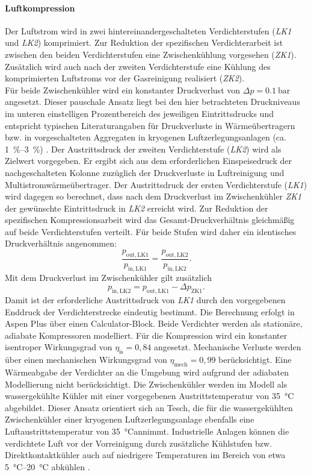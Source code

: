 \paragraph{Luftkompression}\label{sec:modell_komression} Der Luftstrom wird in zwei hintereinandergeschalteten Verdichterstufen (\textit{LK1} und \textit{LK2}) komprimiert. Zur Reduktion der spezifischen Verdichterarbeit ist zwischen den beiden Verdichterstufen eine Zwischenkühlung vorgesehen (\textit{ZK1}). Zusätzlich wird auch nach der zweiten Verdichterstufe eine Kühlung des komprimierten Luftstroms vor der Gasreinigung realisiert (\textit{ZK2}). \\
Für beide Zwischenkühler wird ein konstanter Druckverlust von \(\Delta p = \SI{0,1}{\bar}\) angesetzt. Dieser pauschale Ansatz liegt bei den hier betrachteten Druckniveaus im unteren einstelligen Prozentbereich des jeweiligen Eintrittsdrucks und entspricht typischen Literaturangaben für Druckverluste in Wärmeübertragern bzw. in vorgeschalteten Aggregaten in kryogenen Luftzerlegungsanlagen (ca. \SIrange{1}{3}{\percent}) \cite{teschExergybasedMethodsApplied, zhouProcessConfigurationsSimulations}.
Der Austrittsdruck der zweiten Verdichterstufe (\textit{LK2}) wird als
Zielwert vorgegeben. Er ergibt sich aus dem erforderlichen Einspeisedruck der nachgeschalteten Kolonne zuzüglich der Druckverluste in Luftreinigung und Multistromwärmeübertrager. Der Austrittsdruck der ersten Verdichterstufe (\textit{LK1}) wird dagegen so berechnet, dass nach dem Druckverlust im Zwischenkühler \textit{ZK1} der gewünschte Eintrittsdruck in \textit{LK2} erreicht wird. Zur Reduktion der spezifischen Kompressionsarbeit wird das Gesamt-Druckverhältnis gleichmäßig auf beide Verdichterstufen verteilt. Für beide Stufen wird daher
ein identisches Druckverhältnis angenommen:
\[
\frac{p_{\mathrm{out, LK1}}}{p_{\mathrm{in, LK1}}}
=
\frac{p_{\mathrm{out, LK2}}}{p_{\mathrm{in, LK2}}}.
\]
Mit dem Druckverlust im Zwischenkühler gilt zusätzlich
\[
p_{\mathrm{in, LK2}} = p_{\mathrm{out, LK1}} - \Delta p_{\mathrm{ZK1}}.
\]
Damit ist der erforderliche Austrittsdruck von \textit{LK1} durch den
vorgegebenen Enddruck der Verdichterstrecke eindeutig bestimmt. Die Berechnung
erfolgt in Aspen Plus über einen Calculator-Block. Beide Verdichter werden als stationäre, adiabate Kompressoren modelliert. Für
die Kompression wird ein konstanter isentroper Wirkungsgrad von
$\eta_\mathrm{is} = 0{,}84$ angesetzt. Mechanische Verluste werden über einen
mechanischen Wirkungsgrad von $\eta_\mathrm{mech} = 0{,}99$ berücksichtigt. Eine Wärmeabgabe der Verdichter an die Umgebung wird aufgrund der adiabaten Modellierung nicht berücksichtigt.
Die Zwischenkühler werden im Modell als wassergekühlte Kühler mit einer vorgegebenen Austrittstemperatur von \SI{35}{\celsius} abgebildet. Dieser Ansatz orientiert sich an Tesch, die für die wassergekühlten Zwischenkühler einer kryogenen Luftzerlegungsanlage ebenfalls eine Luftaustrittstemperatur von \SI{35}{\celsius}annimmt. Industrielle Anlagen können die verdichtete Luft vor der Vorreinigung durch zusätzliche Kühlstufen bzw. Direktkontaktkühler auch auf niedrigere Temperaturen im Bereich von etwa \SIrange{5}{20}{\celsius} abkühlen \cite{teschExergybasedMethodsApplied, heinz-wolfgangharingAirGasesNitrogen2007}.\\

